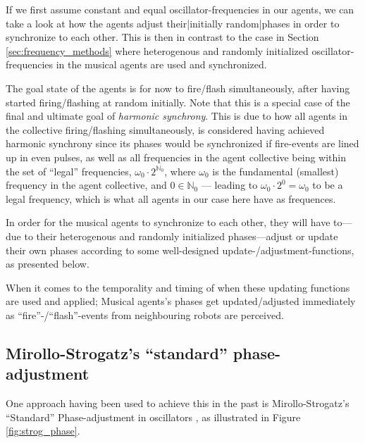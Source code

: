 	If we first assume constant and equal oscillator-frequencies in our agents, we can take a look at how the agents adjust their|initially random|phases in order to synchronize to each other. This is then in contrast to the case in Section \ref{sec:frequency_methods} where heterogenous and randomly initialized oscillator-frequencies in the musical agents are used and synchronized.
	
	The goal state of the agents is for now to fire/flash simultaneously, after having started firing/flashing at random initially. Note that this is a special case of the final and ultimate goal of \textit{harmonic synchrony}. This is due to how all agents in the collective firing/flashing simultaneously, is considered having achieved harmonic synchrony since its phases would be synchronized if fire-events are lined up in even pulses, as well as all frequencies in the agent collective being within the set of ``legal'' frequencies, $\omega_{0} \cdot 2^{\mathbb{N}_0}$, where $\omega_0$ is the fundamental (smallest) frequency in the agent collective, and $0 \in \mathbb{N}_0$ — leading to $\omega_0 \cdot 2^0 = \omega_0$ to be a legal frequency, which is what all agents in our case here have as frequences.
	
	In order for the musical agents to synchronize to each other, they will have to—due to their heterogenous and randomly initialized phases—adjust or update their own phases according to some well-designed update-/adjustment-functions, as presented below.
	
	When it comes to the temporality and timing of when these updating functions are used and applied; Musical agents's phases get updated/adjusted immediately as ``fire''-/``flash''-events from neighbouring robots are perceived.

	
	
	\subsection{Mirollo-Strogatz's ``standard'' phase-adjustment} %
	
	One approach having been used to achieve this in the past is Mirollo-Strogatz's ``Standard'' Phase-adjustment in oscillators \cite{mirollo_strogatz_PCO_synch}, as illustrated in Figure \ref{fig:strog_phase}.
			
